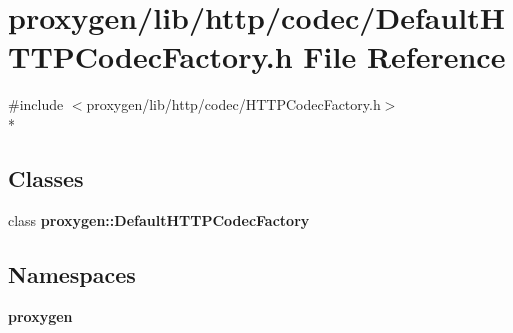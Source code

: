 \section{proxygen/lib/http/codec/\+Default\+H\+T\+T\+P\+Codec\+Factory.h File Reference}
\label{DefaultHTTPCodecFactory_8h}
{\ttfamily \#include $<$proxygen/lib/http/codec/\+H\+T\+T\+P\+Codec\+Factory.\+h$>$}\\*
\subsection*{Classes}
\begin{DoxyCompactItemize}
\item 
class {\bf proxygen\+::\+Default\+H\+T\+T\+P\+Codec\+Factory}
\end{DoxyCompactItemize}
\subsection*{Namespaces}
\begin{DoxyCompactItemize}
\item 
 {\bf proxygen}
\end{DoxyCompactItemize}

